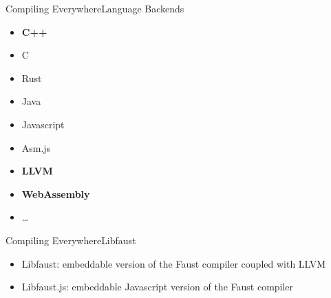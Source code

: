 \begin{frame}[fragile]{Compiling Everywhere}{Language Backends}
    \begin{itemize}
        \item \textbf{C++}
        \item C
        \item Rust
        \item Java
        \item Javascript
        \item Asm.js
        \item \textbf{LLVM}
        \item \textbf{WebAssembly}
        \item \ldots
    \end{itemize}
\end{frame}



\begin{frame}[fragile]{Compiling Everywhere}{Libfaust}
    \begin{itemize}
        \item Libfaust: embeddable version of the Faust compiler coupled with LLVM
        \item Libfaust.js: embeddable Javascript version of the Faust compiler
    \end{itemize}
\end{frame}


